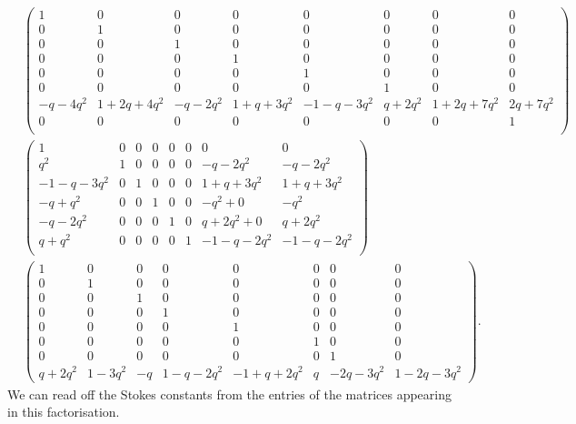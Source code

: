 \documentclass[pdftex]{sigma}
\numberwithin{equation}{section}
\begin{document}
{\begin{align*}
&\begin{pmatrix}
1 & 0 & 0 & 0 & 0 & 0 & 0 & 0\\
0 & 1 & 0 & 0 & 0 & 0 & 0 & 0\\
0 & 0 & 1 & 0 & 0 & 0 & 0 & 0\\
0 & 0 & 0 & 1 & 0 & 0 & 0 & 0\\
0 & 0 & 0 & 0 & 1 & 0 & 0 & 0\\
0 & 0 & 0 & 0 & 0 & 1 & 0 & 0\\
-q\!-\!4q^2 & 1\!+\!2q\!+\!4q^2 & -q\!-\!2q^2 & 1\!+\!q\!+\!3q^2 & -1\!-\!q\!-\!3q^2 & q\!+\!2q^2 & 1\!+\!2q\!+\!7q^2 & 2q\!+\!7q^2\\
0 & 0 & 0 & 0 & 0 & 0 & 0 & 1\\
\end{pmatrix}\\[-0.5mm]
&\begin{pmatrix}
1 & 0 & 0 & 0 & 0 & 0 & 0 & 0\\
q^2 & 1 & 0 & 0 & 0 & 0 & -q\!-\!2q^2 & -q\!-\!2q^2\\
-1\!-\!q\!-\!3q^2 & 0 & 1 & 0 & 0 & 0 & 1\!+\!q\!+\!3q^2 & 1\!+\!q\!+\!3q^2\\
-q\!+\!q^2 & 0 & 0 & 1 & 0 & 0 & -q^2\!+\!0 & -q^2\\
-q\!-\!2q^2 & 0 & 0 & 0 & 1 & 0 & q\!+\!2q^2\!+\!0 & q\!+\!2q^2\\
q\!+\!q^2 & 0 & 0 & 0 & 0 & 1 & -1\!-\!q\!-\!2q^2 & -1\!-\!q\!-\!2q^2\\
\end{pmatrix}\\[-0.5mm]
&\begin{pmatrix}
1 & 0 & 0 & 0 & 0 & 0 & 0 & 0\\
0 & 1 & 0 & 0 & 0 & 0 & 0 & 0\\
0 & 0 & 1 & 0 & 0 & 0 & 0 & 0\\
0 & 0 & 0 & 1 & 0 & 0 & 0 & 0\\
0 & 0 & 0 & 0 & 1 & 0 & 0 & 0\\
0 & 0 & 0 & 0 & 0 & 1 & 0 & 0\\
0 & 0 & 0 & 0 & 0 & 0 & 1 & 0\\
q\!+\!2q^2 & 1\!-\!3q^2 & -q & 1\!-\!q\!-\!2q^2 & -1\!+\!q\!+\!2q^2 & q & -2q\!-\!3q^2 & 1\!-\!2q\!-\!3q^2
\end{pmatrix} .
\end{align*}}%
We can read off the Stokes constants from the entries of the matrices appearing in this factorisation.
\end{document}
